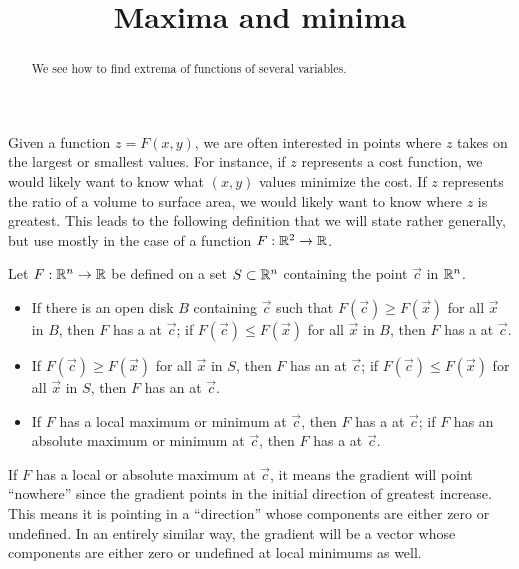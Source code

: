 \documentclass{ximera}
\title[Dig-In:]{Maxima and minima}
\begin{document}
\begin{abstract}
  We see how to find extrema of functions of several variables.
\end{abstract}
\maketitle

Given a function $z=F(x,y)$, we are often interested in points where
$z$ takes on the largest or smallest values. For instance, if $z$
represents a cost function, we would likely want to know what $(x,y)$
values minimize the cost. If $z$ represents the ratio of a volume to
surface area, we would likely want to know where $z$ is greatest. This
leads to the following definition that we will state rather generally,
but use mostly in the case of a function $F:\mathbb R^2\to\mathbb R$.

\begin{definition}
Let $F:\mathbb R^n\to\mathbb R$ be defined on a set $S\subset\mathbb R^n$ containing the
point $\vec{c}$ in $\mathbb R^n$.
\begin{itemize}
\item If there is an open disk $B$ containing $\vec{c}$ such that
  $F(\vec{c}) \geq F(\vec{x})$ for all $\vec{x}$ in $B$, then $F$ has a
   at $\vec{c}$; if $F(\vec{c}) \leq F(\vec{x})$ for all
  $\vec{x}$ in $B$, then $F$ has a  at $\vec{c}$.
\item If $F(\vec{c})\geq F(\vec{x})$ for all $\vec{x}$ in $S$, then $F$ has
  an  at $\vec{c}$; if $F(\vec{c})\leq F(\vec{x})$ for
  all $\vec{x}$ in $S$, then $F$ has an  at
  $\vec{c}$.
\item If $F$ has a local maximum or minimum at $\vec{c}$, then $F$ has a
   at $\vec{c}$; if $F$ has an absolute maximum or
  minimum at $\vec{c}$, then $F$ has a  at $\vec{c}$.
\end{itemize}
\end{definition}

If $F$ has a local or absolute maximum at $\vec{c}$, it means the
gradient will point ``nowhere'' since the gradient points in the
initial direction of greatest increase. This means it is pointing in a
``direction'' whose components are either zero or undefined. In an
entirely similar way, the gradient will be a vector whose components
are either zero or undefined at local minimums as well. 
\end{document}
